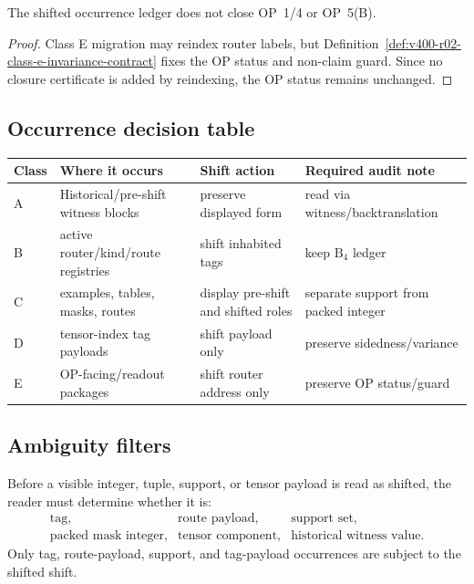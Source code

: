 \begin{lemma}
\label{lem:v400-r02-class-e-status-preservation}
The shifted occurrence ledger does not close OP~1/4 or OP~5(B).
\end{lemma}

\begin{proof}
Class E migration may reindex router labels, but
Definition~\ref{def:v400-r02-class-e-invariance-contract} fixes the OP status
and non-claim guard. Since no closure certificate is added by reindexing, the
OP status remains unchanged.
\end{proof}

\subsection{Occurrence decision table}
\label{subsec:v400-r02-occurrence-decision-table}

\begin{center}
\tiny
\setlength{\tabcolsep}{2pt}
\begin{tabular}{@{}p{}P{0.24\textwidth}P{0.23\textwidth}P{0.26\textwidth}@{}}
\toprule
Class & Where it occurs & Shift action & Required audit note\\
\midrule
A & Historical/pre-shift witness blocks & preserve displayed form & read via witness/backtranslation\\
B & active router/kind/route registries & shift inhabited tags & keep $\mathrm B_4$ ledger\\
C & examples, tables, masks, routes & display pre-shift and shifted roles & separate support from packed integer\\
D & tensor-index tag payloads & shift payload only & preserve sidedness/variance\\
E & OP-facing/readout packages & shift router address only & preserve OP status/guard\\
\bottomrule
\end{tabular}
\end{center}

\subsection{Ambiguity filters}
\label{subsec:v400-r02-ambiguity-filters}

\begin{definition}
\label{def:v400-r02-ambiguity-filter}
Before a visible integer, tuple, support, or tensor payload is read as shifted,
the reader must determine whether it is:
\[
\begin{array}{lll}
 \text{tag},&
 \text{route payload},&
 \text{support set},\\
 \text{packed mask integer},&
 \text{tensor component},&
 \text{historical witness value}.
\end{array}
\]
Only tag, route-payload, support, and tag-payload occurrences are subject to
the shifted shift.
\end{definition}

